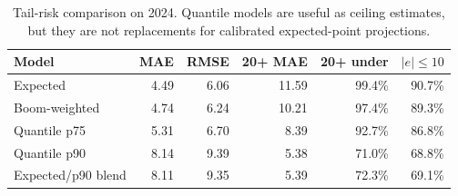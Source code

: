 \begin{table}[!htbp]
\caption{Tail-risk comparison on 2024. Quantile models are useful as ceiling estimates, but they are not replacements for calibrated expected-point projections.}
\label{tab:tail}
\centering
\footnotesize
\begin{tabular}{lrrrrr}
\toprule
Model & MAE & RMSE & 20+ MAE & 20+ under & $|e|\leq10$ \\
\midrule
Expected & 4.49 & 6.06 & 11.59 & 99.4\% & 90.7\% \\
Boom-weighted & 4.74 & 6.24 & 10.21 & 97.4\% & 89.3\% \\
Quantile p75 & 5.31 & 6.70 & 8.39 & 92.7\% & 86.8\% \\
Quantile p90 & 8.14 & 9.39 & 5.38 & 71.0\% & 68.8\% \\
Expected/p90 blend & 8.11 & 9.35 & 5.39 & 72.3\% & 69.1\% \\
\bottomrule
\end{tabular}
\end{table}
